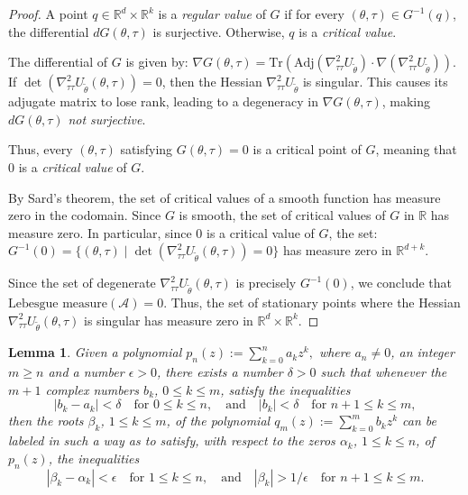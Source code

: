 \documentclass{article}
\let\cite\relax
\newcommand*{\cite}{\citep}
\def\gA{{\mathcal{A}}}
\newtheorem{lemma}{Lemma}%
\theoremstyle{definition}
\begin{document}
\begin{proof}
A point $q \in \mathbb{R}^{d} \times \mathbb{R}^k$ is a \emph{regular value} of $G$ if for every $(\theta, \tau) \in G^{-1}(q)$, the differential $dG(\theta, \tau)$ is surjective. Otherwise, $q$ is a \emph{critical value}.

The differential of $G$ is given by: $\nabla G(\theta, \tau) = \text{Tr} \left( \text{Adj}(\nabla_{\tau\tau}^2 U_{\tilde\theta}) \cdot \nabla (\nabla_{\tau\tau}^2 U_{\tilde\theta}) \right).$
If $\det(\nabla_{\tau\tau}^2 U_{\tilde\theta}(\theta, \tau)) = 0$, then the Hessian $\nabla_{\tau\tau}^2 U_{\tilde\theta}$ is singular. This causes its adjugate matrix to lose rank, leading to a degeneracy in $\nabla G(\theta, \tau)$, making $dG(\theta, \tau)$ \emph{not surjective}.

Thus, every $(\theta, \tau)$ satisfying $G(\theta, \tau) = 0$ is a critical point of $G$, meaning that $0$ is a \emph{critical value} of $G$.

By Sard’s theorem, the set of critical values of a smooth function has measure zero in the codomain. Since $G$ is smooth, the set of critical values of $G$ in $\mathbb{R}$ has measure zero. In particular, since $0$ is a critical value of $G$, the set:
$G^{-1}(0) = \{ (\theta, \tau) \mid \det(\nabla_{\tau\tau}^2 U_{\tilde\theta}(\theta, \tau)) = 0 \}$
has measure zero in $\mathbb{R}^{d+k}$.

Since the set of degenerate $\nabla_{\tau\tau}^2 U_{\tilde\theta}(\theta, \tau)$ is precisely $G^{-1}(0)$, we conclude that
$\text{Lebesgue measure}(\gA) = 0.$ Thus, the set of stationary points where the Hessian $\nabla_{\tau\tau}^2 U_{\tilde\theta}(\theta, \tau)$ is singular has measure zero in $\mathbb{R}^{d}\times \mathbb{R}^k$.
    \end{proof}
\begin{lemma}\cite{mishael_lemma}
\label{rootsmishael}
\textit{Given a polynomial} 
$
p_n(z) := \sum_{k=0}^{n} a_k z^k,
$
\textit{where} $ a_n \neq 0 $, \textit{an integer} $ m \geq n $ \textit{and a number} $ \epsilon > 0 $, 
\textit{there exists a number} $ \delta > 0 $ \textit{such that whenever the} $ m+1 $ \textit{complex numbers} $ b_k $, $ 0 \leq k \leq m $, 
\textit{satisfy the inequalities}
\begin{equation*}
|b_k - a_k| < \delta \quad \text{for } 0 \leq k \leq n, \quad \text{and} \quad |b_k| < \delta \quad \text{for } n+1 \leq k \leq m,
\end{equation*}
then the roots $ \beta_k $, $ 1 \leq k \leq m $, of the polynomial
$
q_m(z) := \sum_{k=0}^{m} b_k z^k
$
can be labeled in such a way as to satisfy, with respect to the zeros $ \alpha_k $, $ 1 \leq k \leq n $, \textit{of} $ p_n(z) $, the inequalities
\begin{equation*}
|\beta_k - \alpha_k| < \epsilon \quad \text{for } 1 \leq k \leq n, \quad \text{and} \quad |\beta_k| > 1/\epsilon \quad \text{for } n+1 \leq k \leq m.
\end{equation*}
\end{lemma}
\end{document}
